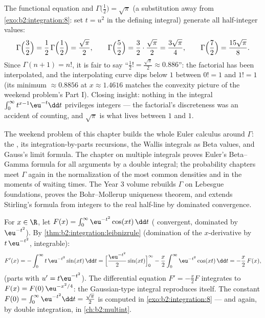 \begin{example}\label{ex:b2:integration:halffactorial}
The functional equation and $\Gamma\bigl(\frac12\bigr) =
\sqrt\pi$ (a substitution away from
\cref{exo:b2:integration:8}: set $t = u^2$ in the defining
integral) generate all half-integer values:
\[
\Gamma\Bigl(\frac32\Bigr) = \frac12\,\Gamma\Bigl(\frac12\Bigr)
= \frac{\sqrt\pi}{2},
\qquad
\Gamma\Bigl(\frac52\Bigr) = \frac32\cdot\frac{\sqrt\pi}{2}
= \frac{3\sqrt\pi}{4},
\qquad
\Gamma\Bigl(\frac72\Bigr) = \frac{15\sqrt\pi}{8} .
\]
Since $\Gamma(n+1) = n!$, it is fair to say ``$\frac12! =
\frac{\sqrt\pi}{2} \approx 0.886$'': the factorial has been
interpolated, and the interpolating curve dips below $1$
between $0! = 1$ and $1! = 1$ (its minimum $\approx 0.8856$ at
$x \approx 1.4616$ matches the convexity picture of the
weekend problem's Part I). Closing insight: nothing in the
integral $\int_0^\infty t^{x-1}\eu^{-t}\dd t$ privileges
integers --- the factorial's discreteness was an accident of
counting, and $\sqrt\pi$ is what lives between $1$ and $1$.
\end{example}

\begin{remark}
The weekend problem of this chapter builds the whole Euler
calculus around $\Gamma$: the , its integration-by-parts
recursions, the Wallis integrals as Beta values, and Gauss's
limit formula. The chapter on multiple integrals proves Euler's
Beta--Gamma formula for all arguments by a double integral; the
probability chapters meet $\Gamma$ again in the normalization of
the most common densities and in the moments of waiting times.
The Year 3 volume rebuilds $\Gamma$ on Lebesgue foundations,
proves the Bohr--Mollerup uniqueness theorem, and extends
Stirling's formula from integers to the real half-line by
dominated convergence.
\end{remark}

\begin{example}\label{ex:b2:integration:laplace}
For $x \in \R$, let $F(x) = \int_0^{\infty} \eu^{-t^2}\cos(xt)\,\dd
t$ ( convergent, dominated by $\eu^{-t^2}$). By
\cref{thm:b2:integration:leibnizrule} (domination of the
$x$-derivative by $t\,\eu^{-t^2}$, integrable):
\[
F'(x) = -\int_0^\infty t\,\eu^{-t^2}\sin(xt)\,\dd t
= \Bigl[\frac{\eu^{-t^2}}{2}\sin(xt)\Bigr]_0^\infty
- \frac x2\int_0^\infty \eu^{-t^2}\cos(xt)\,\dd t
= -\frac x2\,F(x),
\]
(parts with $u' = t\eu^{-t^2}$). The differential equation $F' =
-\frac x2 F$ integrates to $F(x) = F(0)\,\eu^{-x^2/4}$: the
Gaussian-type integral reproduces itself. The constant $F(0) =
\int_0^\infty \eu^{-t^2}\dd t = \frac{\sqrt\pi}{2}$ is computed in
\cref{exo:b2:integration:8} --- and again, by double integration,
in \cref{ch:b2:multint}.
\end{example}


